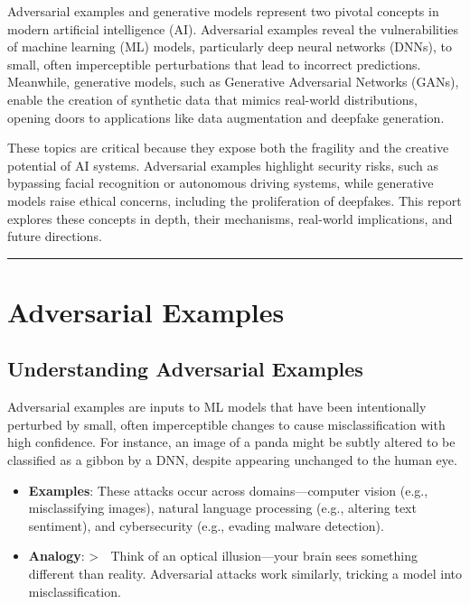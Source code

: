 \documentclass[
  letterpaper,
  DIV=11,
  numbers=noendperiod]{scrreprt}
\providecommand{\tightlist}{%
  \setlength{\itemsep}{0pt}\setlength{\parskip}{0pt}}\usepackage{longtable,booktabs,array}
\begin{document}
Adversarial examples and generative models represent two pivotal
concepts in modern artificial intelligence (AI). Adversarial examples
reveal the vulnerabilities of machine learning (ML) models, particularly
deep neural networks (DNNs), to small, often imperceptible perturbations
that lead to incorrect predictions. Meanwhile, generative models, such
as Generative Adversarial Networks (GANs), enable the creation of
synthetic data that mimics real-world distributions, opening doors to
applications like data augmentation and deepfake generation.

These topics are critical because they expose both the fragility and the
creative potential of AI systems. Adversarial examples highlight
security risks, such as bypassing facial recognition or autonomous
driving systems, while generative models raise ethical concerns,
including the proliferation of deepfakes. This report explores these
concepts in depth, their mechanisms, real-world implications, and future
directions.

\begin{center}\rule{0.5\linewidth}{0.5pt}\end{center}

\section{Adversarial Examples}\label{adversarial-examples}

\subsection{Understanding Adversarial
Examples}\label{understanding-adversarial-examples}

Adversarial examples are inputs to ML models that have been
intentionally perturbed by small, often imperceptible changes to cause
misclassification with high confidence. For instance, an image of a
panda might be subtly altered to be classified as a gibbon by a DNN,
despite appearing unchanged to the human eye.

\begin{itemize}
\tightlist
\item
  \textbf{Examples}: These attacks occur across domains---computer
  vision (e.g., misclassifying images), natural language processing
  (e.g., altering text sentiment), and cybersecurity (e.g., evading
  malware detection).
\item
  \textbf{Analogy}: \textgreater{} 🔎 Think of an optical
  illusion---your brain sees something different than reality.
  Adversarial attacks work similarly, tricking a model into
  misclassification.
\end{itemize}
\end{document}
